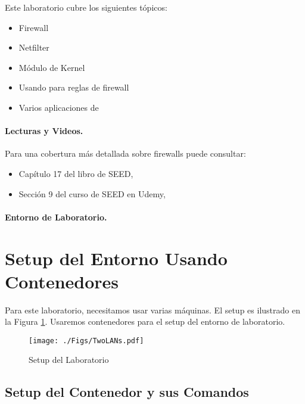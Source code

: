 Este laboratorio cubre los siguientes tópicos:


\begin{itemize}[noitemsep]
\item Firewall
\item Netfilter
\item Módulo de Kernel 
\item Usando \iptables para reglas de firewall
\item Varios aplicaciones de \iptables
\end{itemize}


\paragraph{Lecturas y Videos.}
Para una cobertura más detallada sobre firewalls puede consultar:

\begin{itemize}
\item Capítulo 17 del libro de SEED, \seedbook
\item Sección 9 del curso de SEED en Udemy, \seedisvideo
\end{itemize}


\paragraph{Entorno de Laboratorio.} \seedenvironmentC




\section{Setup del Entorno Usando Contenedores}

Para este laboratorio, necesitamos usar varias máquinas.
El setup es ilustrado en la Figura \ref{fig:labsetup}. 
Usaremos contenedores para el setup del entorno de laboratorio.


\begin{figure}[htb]
\begin{center}
\texttt{[image: ./Figs/TwoLANs.pdf]}
\end{center}
\caption{Setup del Laboratorio}
\label{fig:labsetup}
\end{figure}


\subsection{Setup del Contenedor y sus Comandos}





